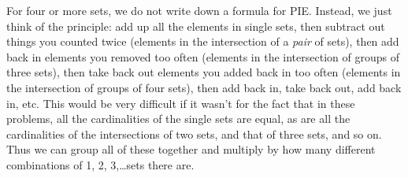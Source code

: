 \documentclass[12pt]{article}
\begin{document}
For four or more sets, we do not write down a formula for PIE.  Instead, we just think of the principle: add up all the elements in single sets, then subtract out things you counted twice (elements in the intersection of a {\em pair} of sets), then add back in elements you removed too often (elements in the intersection of groups of three sets), then take back out elements you added back in too often (elements in the intersection of groups of four sets), then add back in, take back out, add back in, etc.  This would be very difficult if it wasn't for the fact that in these problems, all the cardinalities of the single sets are equal, as are all the cardinalities of the intersections of two sets, and that of three sets, and so on.  Thus we can group all of these together and multiply by how many different combinations of 1, 2, 3,\ldots sets there are.
\end{document}
